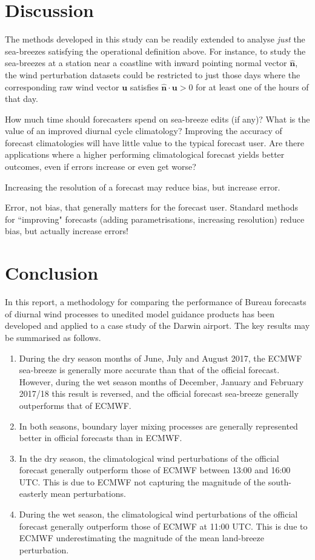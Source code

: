 \documentclass[alpha-refs]{wiley-article}
\begin{document}
\section{Discussion}
\label{discussion}

The methods developed in this study can be readily extended to analyse \emph{just} the sea-breezes satisfying the operational definition above. For instance, to study the sea-breezes at a station near a coastline with inward pointing normal vector $\widehat{\boldsymbol{n}}$, the wind perturbation datasets could be restricted to just those days where the corresponding raw wind vector $\boldsymbol{u}$ satisfies $\widehat{\boldsymbol{n}} \cdot \boldsymbol{u} > 0$ for at least one of the hours of that day.

How much time should forecasters spend on sea-breeze edits (if any)? What is the value of an improved diurnal cycle climatology? Improving the accuracy of forecast climatologies will have little value to the typical forecast user. Are there applications where a higher performing climatological forecast yields better outcomes, even if errors increase or even get worse? 

Increasing the resolution of a forecast may reduce bias, but increase error.  

Error, not bias, that generally matters for the forecast user. Standard methods for ``improving" forecasts (adding parametrisations, increasing resolution) reduce bias, but actually increase errors! 

\section{Conclusion}
\label{conclusion}
In this report, a methodology for comparing the performance of Bureau forecasts of diurnal wind processes to unedited model guidance products has been developed and applied to a case study of the Darwin airport. The key results may be summarised as follows.
\begin{enumerate}
\item
During the dry season months of June, July and August 2017, the ECMWF sea-breeze is generally more accurate than that of the official forecast. However, during the wet season months of December, January and February 2017/18 this result is reversed, and the official forecast sea-breeze generally outperforms that of ECMWF. 
\item
In both seasons, boundary layer mixing processes are generally represented better in official forecasts than in ECMWF.
\item
In the dry season, the climatological wind perturbations of the official forecast generally outperform those of ECMWF between 13:00 and 16:00 UTC. This is due to ECMWF not capturing the magnitude of the south-easterly mean perturbations. 
\item
During the wet season, the climatological wind perturbations of the official forecast generally outperform those of ECMWF at 11:00 UTC. This is due to ECMWF underestimating the magnitude of the mean land-breeze perturbation.
\end{enumerate}
\end{document}
